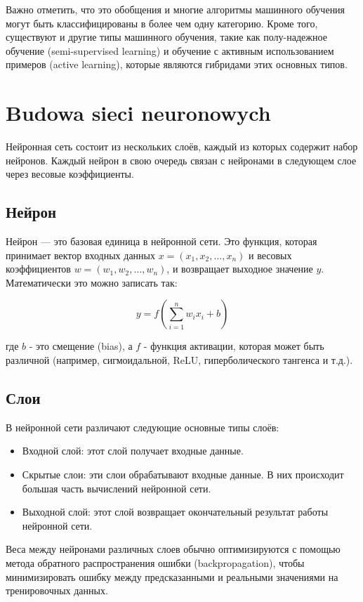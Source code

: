 Важно отметить, что это обобщения и многие алгоритмы машинного обучения могут быть классифицированы в более чем одну категорию.
Кроме того, существуют и другие типы машинного обучения, такие как полу-надежное обучение (semi-supervised learning) и обучение с активным использованием примеров (active learning), которые являются гибридами этих основных типов.


\section{Budowa sieci neuronowych}

Нейронная сеть состоит из нескольких слоёв, каждый из которых содержит набор нейронов. Каждый нейрон в свою очередь связан с нейронами в следующем слое через весовые коэффициенты. 

\subsection*{Нейрон}

Нейрон — это базовая единица в нейронной сети. Это функция, которая принимает вектор входных данных $x = (x_1, x_2, \dots, x_n)$ и весовых коэффициентов $w = (w_1, w_2, \dots, w_n)$, и возвращает выходное значение $y$. Математически это можно записать так:

\begin{equation}
y = f\left(\sum_{i=1}^{n} w_i x_i + b\right)
\end{equation}

где $b$ - это смещение (bias), а $f$ - функция активации, которая может быть различной (например, сигмоидальной, ReLU, гиперболического тангенса и т.д.).

\subsection*{Слои}

В нейронной сети различают следующие основные типы слоёв:

\begin{itemize}
\item Входной слой: этот слой получает входные данные.
\item Скрытые слои: эти слои обрабатывают входные данные. В них происходит большая часть вычислений нейронной сети.
\item Выходной слой: этот слой возвращает окончательный результат работы нейронной сети.
\end{itemize}

Веса между нейронами различных слоев обычно оптимизируются с помощью метода обратного распространения ошибки (backpropagation), чтобы минимизировать ошибку между предсказанными и реальными значениями на тренировочных данных.
